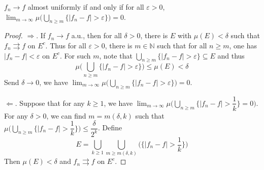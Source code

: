 \documentclass[11pt,singlecolumn, openany, citestyle=authoryear]{elegantbook}
\begin{document}
\begin{CJK}{UTF8}{gbsn}
\begin{proposition}\label{prop:prop4}
    $f_n \to f$ almost uniformly if and only if for all $\varepsilon>0$,
    $\displaystyle \lim_{m\to\infty} \mu\biggl(
        \bigcup_{n\geqslant m}\{|f_n-f|>\varepsilon\}
    \biggr)=0 $.
\end{proposition}
\begin{proof}
    $\Longrightarrow$. If $f_n \to f$ a.u., then for all $\delta>0$, there is $E$
    with $\mu(E)<\delta$ such that $f_n \rightrightarrows f$ on $E^c$. Thus 
    for all $\varepsilon>0$, there is $m\in\mathbb{N}$ such that for all $n\geqslant m$,
    one has $|f_n-f|< \varepsilon$ on $E^c$. For such $m$, note that 
    $\displaystyle \bigcup_{n\geqslant m} \{|f_n-f|>\varepsilon\}\subseteq E$ and thus 
    $$
    \mu \biggl(
        \bigcup_{n\geqslant m}\{|f_n-f|>\varepsilon\} \biggr) \leqslant \mu(E)<\delta
    $$ 
    Send $\delta \to 0$, we have $\displaystyle \lim_{m\to\infty} \mu\biggl(
        \bigcup_{n\geqslant m}\{|f_n-f|>\varepsilon\}
    \biggr)=0$.

    $\Longleftarrow$. Suppose that for any $k\geqslant 1$, we have 
    $\displaystyle \lim_{m\to\infty} \mu\biggl(
        \bigcup_{n\geqslant m}\bigg\{|f_n-f|>\dfrac{1}{k}\bigg\}=0
    \biggr)$. For any $\delta>0$, we can find $m=m(\delta,k)$ such that 
    $ \mu\biggl(\displaystyle
        \bigcup_{n\geqslant m}\bigg\{|f_n-f|>\dfrac{1}{k}\bigg\}
    \biggr)\leqslant \dfrac{\delta}{2^k}$. Define 
    $$
    E= \bigcup_{k\geqslant 1}\bigcup_{m\geqslant m(\delta,k)}
    \biggl(
        \bigg\{|f_n-f|>\dfrac{1}{k}\bigg\}
    \biggr)
    $$
    Then $\mu(E)<\delta$ and $f_n \rightrightarrows f$ on $E^c$.
\end{proof}


\end{CJK}
\end{document}
